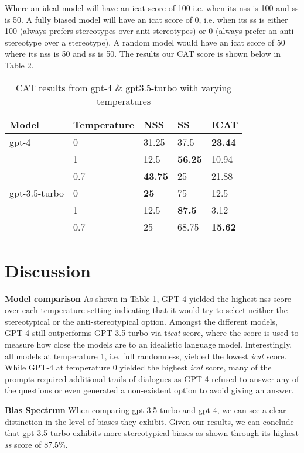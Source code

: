 \documentclass{article}
\begin{document}
Where an ideal model will have an icat score of 100 i.e. when its nss is 100 and ss is 50. A fully biased model will have an icat score of 0, i.e. when its ss is either 100 (always prefers stereotypes over anti-stereotypes) or 0 (always prefer an anti-stereotype over a stereotype). A random model would have an icat score of 50 where its nss is 50 and ss is 50. The results our CAT score is shown below in Table 2. 
\begin{table}[h!]
\centering
\caption{CAT results from gpt-4 \& gpt3.5-turbo with varying temperatures}
\begin{tabular}{@{}lllll@{}}
\toprule
Model            & Temperature & NSS   & SS    & ICAT  \\ \midrule
gpt-4            & 0           & 31.25 & 37.5  & \textbf{23.44} \\
                 & 1           & 12.5  & \textbf{56.25} & 10.94 \\
                 & 0.7           & \textbf{43.75} & 25    & 21.88 \\ \addlinespace
gpt-3.5-turbo    & 0           & \textbf{25}    & 75    & 12.5  \\
                 & 1           & 12.5  & \textbf{87.5}  & 3.12  \\
                 & 0.7           & 25    & 68.75 & \textbf{15.62} \\ \bottomrule
\end{tabular}
\end{table}


\section{Discussion}
\textbf{Model comparison} As shown in Table 1, GPT-4 yielded the highest nss score over each temperature setting indicating that it would try to select neither the stereotypical or the anti-stereotypical option. Amongst the different models, GPT-4 still outperforms GPT-3.5-turbo via t\textit{icat} score, where the score is used to measure how close the models are to an idealistic language model. Interestingly, all models at temperature 1, i.e. full randomness, yielded the lowest \textit{icat} score. While GPT-4 at temperature 0 yielded the highest \textit{icat} score, many of the prompts required additional trails of dialogues as GPT-4 refused to answer any of the questions or even generated a non-existent option to avoid giving an answer. 

\textbf{Bias Spectrum} When comparing gpt-3.5-turbo and gpt-4, we can see a clear distinction in the level of biases they exhibit. Given our results, we can conclude that gpt-3.5-turbo exhibits more stereotypical biases as shown through its highest \textit{ss} score of 87.5\%.
\end{document}
